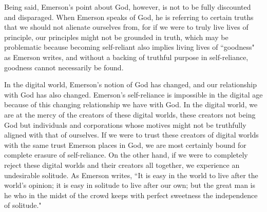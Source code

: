 \documentclass[12pt,letterpaper]{article}
\newif\ifdraft
\begin{document}
Being said, Emerson's point about God, however, is not to be fully discounted and disparaged.  When Emerson speaks of God, he is referring to certain truths that we should not alienate ourselves from, for if we were to truly live lives of principle, our principles might not be grounded in truth, which may be problematic because becoming self-reliant also implies living lives of ``goodness" as Emerson writes, and without a backing of truthful purpose in self-reliance, goodness cannot necessarily be found.
 
 In the digital world, Emerson's notion of God has changed, and our relationship with God has also changed.  Emerson's self-reliance is impossible in the digital age because of this changing relationship we have with God.  In the digital world, we are at the mercy of the creators of these digital worlds, these creators not being God but individuals and corporations whose motives might not be truthfully aligned with that of ourselves.  If we were to trust these creators of digital worlds with the same trust Emerson places in God, we are most certainly bound for complete erasure of self-reliance.  On the other hand, if we were to completely reject these digital worlds and their creators all together, we experience an undesirable solitude.  As Emerson writes, ``It is easy in the world to live after the world’s opinion; it is easy in solitude to live after our own; but the great man is he who in the midst of the crowd keeps with perfect sweetness the independence of solitude."
 
 
 
\ifdraft

When we treat the creators of the digital world with such venerance, we lose hat 


While self-reliance has been shown to be important in the digital world, Emerson's self-reliance can be seen to be overtly extreme.   

Emerson makes no mention about how 

Finally, by participating in these digital worlds, we taking on a new layer of identity, compromising original principles by further following more rules of the digital world and isolating ourselves from a real human identity.  The principles we follow in this digital world will at best be where nothing real is at stake to give certain principles a distinctive triumph, undeterred by qualities afflicting the everyday soul and at worst be the draining of all too many lives who have never achieved self-reliance.
\fi
\end{document}
